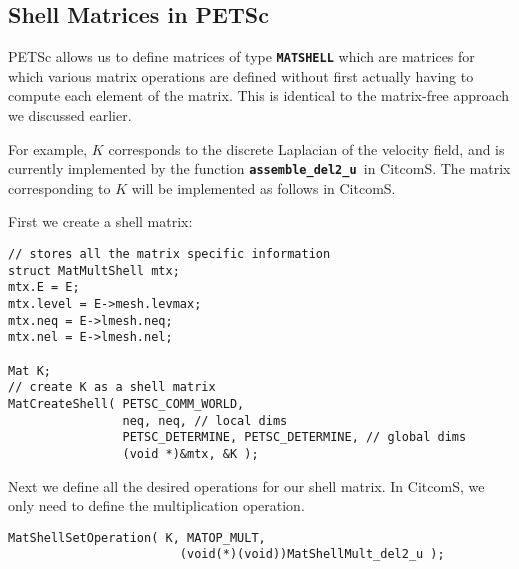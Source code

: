 \documentclass[10pt,letterpaper]{article}
\newcommand{\code}[1]{\textbf{\texttt{#1}}}
\newcommand{\K}{\code{assemble\_del2\_u~}}
\begin{document}
\subsection{Shell Matrices in PETSc}
PETSc allows us to define matrices of type \code{MATSHELL} which are matrices
for which various matrix operations are defined without first actually having 
to compute each element of the matrix. This is identical to the matrix-free
approach we discussed earlier. 

For example, $K$ corresponds to the discrete Laplacian of the velocity field, 
and is currently implemented by the function \K in CitcomS. The matrix
corresponding to $K$ will be implemented as follows in CitcomS.

First we create a shell matrix:
\begin{lstlisting}[frame=tb,mathescape,caption=Creating a shell matrix]
// stores all the matrix specific information
struct MatMultShell mtx;
mtx.E = E;
mtx.level = E->mesh.levmax;
mtx.neq = E->lmesh.neq;
mtx.nel = E->lmesh.nel;

Mat K;
// create K as a shell matrix
MatCreateShell( PETSC_COMM_WORLD, 
                neq, neq, // local dims
                PETSC_DETERMINE, PETSC_DETERMINE, // global dims
                (void *)&mtx, &K );
\end{lstlisting}

Next we define all the desired operations for our shell matrix. In CitcomS,
we only need to define the multiplication operation.
\begin{lstlisting}[frame=tb,mathescape,caption=Matrix operations for shell matrix]
MatShellSetOperation( K, MATOP_MULT, 
                        (void(*)(void))MatShellMult_del2_u );
\end{lstlisting}
\end{document}
